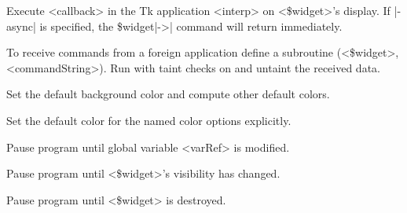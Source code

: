 \begin{enum}{1cm}
Execute <callback> in the Tk application <interp> on <\$widget>'s display.
If |-async| is specified, the \$widget|->| command will return immediately.

To receive commands from a foreign application define a subroutine
(<\$widget>, <commandString>). Run with
taint checks on and untaint the received data.

Set the default background color and compute other default colors.

Set the default color for the named color options explicitly.

Pause program until global variable <varRef> is modified.

Pause program until <\$widget>'s visibility has changed.

Pause program until <\$widget> is destroyed.
 
\end{enum}
